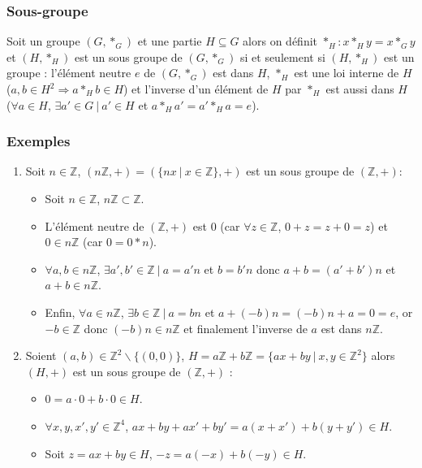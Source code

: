 \documentclass[a4paper,10pt]{book} %
\newcommand{\Z}{\mathbb{Z}}
\newcommand{\tq}{~|~}
\begin{document}
\subsubsection{Sous-groupe}
Soit un groupe $(G,*_G)$ et une partie $H\subseteq G$ alors on définit $*_H : x*_Hy=x*_Gy$ et $(H,*_H)$ est un sous groupe de $(G,*_G)$ si et seulement si $(H,*_H)$ est un groupe : l'élément neutre $e$ de $(G,*_G)$ est dans $H$, $*_H$ est une loi interne de $H$ ($a,b\in H^2 \Rightarrow a*_Hb\in H$) et l'inverse d'un élément de $H$ par $*_H$ est aussi dans $H$ ($\forall a\in H$, $\exists a' \in G\tq a'\in H$ et $a*_Ha'=a'*_Ha=e$).

\subsubsection{Exemples}
\begin{enumerate}
\item Soit $n\in\Z$, $(n\Z,+)=(\{nx\tq x\in\Z\},+)$ est un sous groupe de $(\Z,+)$:

\begin{itemize}[label=$\cdot$]
\item Soit $n\in \Z$, $n\Z\subset\Z$.\\
\item L’élément neutre de $(\Z,+)$ est 0 (car $\forall z\in \Z$, $0+z=z+0=z$) et $0\in n\Z$ (car $0=0*n$).\\
\item $\forall a,b\in n\Z$, $\exists a',b'\in \Z \tq a=a'n$ et $b=b'n$ donc $a+b=(a'+b')n$ et $a+b\in n\Z$.\\
\item Enfin, $\forall a\in n\Z$, $\exists b\in \Z\tq a=bn$ et $a+(-b)n=(-b)n+a=0=e$, or $-b\in \Z$ donc $(-b)n\in n\Z$ et finalement l'inverse de $a$ est dans $n\Z$.\\
\end{itemize}

\item Soient $(a,b)\in\Z^2\backslash \{(0,0)\}$, $H=a\Z+b\Z=\{ax+by\tq x,y\in \Z^2 \}$ alors $(H,+)$ est un sous groupe de $(\Z,+)$ :

\begin{itemize}[label=$\cdot$]
\item $0=a\cdot 0+b\cdot 0\in H$.\\
\item $\forall x,y,x',y'\in\Z^4$, $ax+by+ax'+by'=a(x+x')+b(y+y')\in H$.\\
\item Soit $z=ax+by\in H$, $-z=a(-x)+b(-y)\in H$.
\end{itemize}
\end{enumerate}
\end{document}
